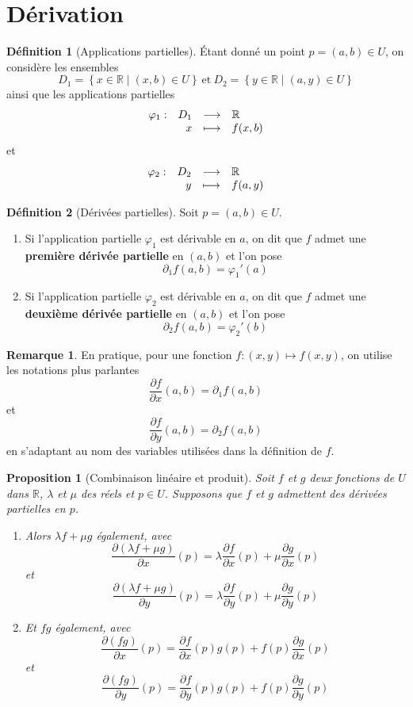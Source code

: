 \documentclass[french]{book}
\newcommand{\R}{\mathbb{R}}
\newcommand{\tq}{\middle|}
\theoremstyle{plain}
\newtheorem{prop}{Proposition}[chapter]
\theoremstyle{definition}
\newtheorem{dfn}{Définition}[chapter]
\newtheorem{rmq}{Remarque}[chapter]
\theoremstyle{remark}
\begin{document}
\section{Dérivation}
\begin{dfn}[Applications partielles]
	Étant donné un point $p=(a,b)\in U$, on considère les ensembles $$D_1=\left\{x\in\R\tq (x,b)\in U\right\} \ \text{et} \ D_2=\left\{y\in\R\tq(a,y)\in U\right\}$$ ainsi que les applications partielles $$
	\begin{array}[t]{lrcl}
		\varphi_1: & D_1 & \longrightarrow & \R \\
		& x & \longmapsto & \displaystyle f(x,b)
	\end{array}
	$$ et 
	$$
	\begin{array}[t]{lrcl}
		\varphi_2: & D_2 & \longrightarrow & \R \\
		& y & \longmapsto & \displaystyle f(a,y)
	\end{array}
	$$
\end{dfn}
\begin{dfn}[Dérivées partielles]
	Soit $p=(a,b)\in U$. \begin{enumerate}
		\item Si l'application partielle $\varphi_1$ est dérivable en $a$, on dit que $f$ admet une \textbf{première dérivée partielle} en $(a,b)$ et l'on pose $$\partial_1f(a,b)=\varphi_1'(a)$$
		\item Si l'application partielle $\varphi_2$ est dérivable en $a$, on dit que $f$ admet une \textbf{deuxième dérivée partielle} en $(a,b)$ et l'on pose $$\partial_2f(a,b)=\varphi_2'(b)$$
	\end{enumerate}
\end{dfn}
\begin{rmq} En pratique, pour une fonction $f:(x,y)\mapsto f(x,y)$, on utilise les notations plus parlantes $$\frac{\partial f}{\partial x}(a,b)=\partial_1f(a,b)$$ et $$\frac{\partial f}{\partial y}(a,b)=\partial_2f(a,b)$$ en s'adaptant au nom des variables utilisées dans la définition de $f$. \end{rmq}
\begin{prop}[Combinaison linéaire et produit]
	Soit $f$ et $g$ deux fonctions de $U$ dans $\R$, $\lambda$ et $\mu$ des réels et $p\in U$. Supposons que $f$ et $g$ admettent des dérivées partielles en $p$.
	\begin{enumerate}
		\item Alors $\lambda f+\mu g$ également, avec $$\frac{\partial(\lambda f+\mu g)}{\partial x}(p)=\lambda\frac{\partial f}{\partial x}(p)+\mu\frac{\partial g}{\partial x}(p)$$ et $$\frac{\partial(\lambda f+\mu g)}{\partial y}(p)=\lambda\frac{\partial f}{\partial y}(p)+\mu\frac{\partial g}{\partial y}(p)$$
		\item Et $fg$ également, avec $$\frac{\partial(fg)}{\partial x}(p)=\frac{\partial f}{\partial x}(p)g(p)+f(p)\frac{\partial g}{\partial x}(p)$$ et $$\frac{\partial(fg)}{\partial y}(p)=\frac{\partial f}{\partial y}(p)g(p)+f(p)\frac{\partial g}{\partial y}(p)$$
	\end{enumerate}
\end{prop}
\end{document}
